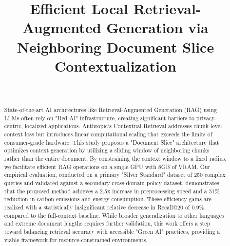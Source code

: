 \documentclass[conference]{IEEEtran}
\begin{document}

\title{Efficient Local Retrieval-Augmented Generation via Neighboring Document Slice Contextualization\\
}

\author{
\\
\and 
{}
}

\maketitle

\begin{abstract}
State-of-the-art AI architectures like Retrieval-Augmented Generation (RAG) using LLMs often rely on "Red AI" infrastructure, creating significant barriers to privacy-centric, localized applications. Anthropic’s Contextual Retrieval addresses chunk-level context loss but introduces linear computational scaling that exceeds the limits of consumer-grade hardware. This study proposes a "Document Slice" architecture that optimizes context generation by utilizing a sliding window of neighboring chunks rather than the entire document. By constraining the context window to a fixed radius, we facilitate efficient RAG operations on a single GPU with 8GB of VRAM. Our empirical evaluation, conducted on a primary "Silver Standard" dataset of 250 complex queries and validated against a secondary cross-domain policy dataset, demonstrates that the proposed method achieves a 2.5x increase in preprocessing speed and a 51\% reduction in carbon emissions and energy consumption. These efficiency gains are realized with a statistically insignificant relative decrease in Recall@20 of 0.9\% compared to the full-context baseline. While broader generalization to other languages and extreme document lengths requires further validation, this work offers a step toward balancing retrieval accuracy with accessible "Green AI" practices, providing a viable framework for resource-constrained environments.
\end{abstract}
\end{document}
